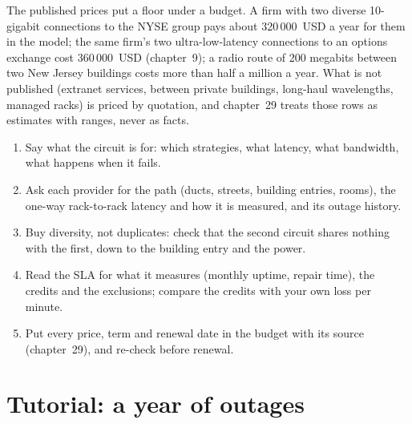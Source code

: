The published prices put a floor under a budget. A firm with two diverse 10-gigabit connections to the NYSE group pays about 320\,000~USD a year
for them in the model; the same firm's two ultra-low-latency connections to an options exchange cost 360\,000~USD (chapter~9); a radio route of 200
megabits between two New Jersey buildings costs more than half a million a year. What is not published (extranet services,  between
private buildings, long-haul wavelengths, managed racks) is priced by quotation, and chapter~29 treats those rows as estimates with ranges, never as
facts.

\begin{method}\label{met:nw:buying-connectivity:buy}
\begin{enumerate}
\item Say what the circuit is for: which strategies, what latency, what bandwidth, what happens when it fails.
\item Ask each provider for the path (ducts, streets, building entries, rooms), the one-way rack-to-rack latency and how it is measured, and its
  outage history.
\item Buy diversity, not duplicates: check that the second circuit shares nothing with the first, down to the building entry and the power.
\item Read the SLA for what it measures (monthly uptime, repair time), the credits and the exclusions; compare the credits with your own loss per
  minute.
\item Put every price, term and renewal date in the budget with its source (chapter~29), and re-check before renewal.
\end{enumerate}
\end{method}

\section{Tutorial: a year of outages}\label{tut:nw:buying-connectivity:tut}

